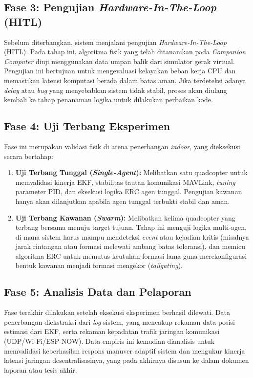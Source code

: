 \documentclass[12pt,a4paper]{report}
\numberwithin{equation}{chapter}
\begin{document}
\subsection{Fase 3: Pengujian \textit{Hardware-In-The-Loop} (HITL\label{abbr:hitl})}
Sebelum diterbangkan, sistem menjalani pengujian \textit{Hardware-In-The-Loop} (HITL). Pada tahap ini, algoritma fisik yang telah ditanamkan pada \textit{Companion Computer} diuji menggunakan data umpan balik dari simulator gerak virtual. Pengujian ini bertujuan untuk mengevaluasi kelayakan beban kerja CPU dan memastikan latensi komputasi berada dalam batas aman. Jika terdeteksi adanya \textit{delay} atau \textit{bug} yang menyebabkan sistem tidak stabil, proses akan diulang kembali ke tahap penanaman logika untuk dilakukan perbaikan kode.

\subsection{Fase 4: Uji Terbang Eksperimen}
Fase ini merupakan validasi fisik di arena penerbangan \textit{indoor}, yang dieksekusi secara bertahap:
\begin{enumerate}
    \item \textbf{Uji Terbang Tunggal (\textit{Single-Agent}):} Melibatkan satu quadcopter untuk memvalidasi kinerja EKF, stabilitas tautan komunikasi MAVLink, \textit{tuning} parameter PID, dan eksekusi logika ERC agen tunggal. Pengujian kawanan hanya akan dilanjutkan apabila agen tunggal terbukti stabil dan aman.
    \item \textbf{Uji Terbang Kawanan (\textit{Swarm}):} Melibatkan kelima quadcopter yang terbang bersama menuju target tujuan. Tahap ini menguji logika multi-agen, di mana sistem harus mampu mendeteksi \textit{event} atau kejadian kritis (misalnya jarak rintangan atau formasi melewati ambang batas toleransi), dan memicu algoritma ERC untuk memutus keutuhan formasi lama guna merekonfigurasi bentuk kawanan menjadi formasi mengekor (\textit{tailgating}).
\end{enumerate}

\subsection{Fase 5: Analisis Data dan Pelaporan}
Fase terakhir dilakukan setelah eksekusi eksperimen berhasil dilewati. Data penerbangan diekstraksi dari \textit{log} sistem, yang mencakup rekaman data posisi estimasi dari EKF, serta rekaman kepadatan trafik jaringan komunikasi (UDP\label{abbr:udp}/Wi-Fi/ESP-NOW). Data empiris ini kemudian dianalisis untuk memvalidasi keberhasilan respons manuver adaptif sistem dan mengukur kinerja latensi jaringan desentralisasinya, yang pada akhirnya disusun ke dalam dokumen laporan atau tesis akhir.
\end{document}
